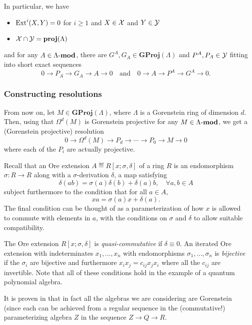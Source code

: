\documentclass[12pt]{article}
\begin{document}
In particular, we have
\begin{itemize}
    \item $\operatorname{Ext}^i(X,Y)=0$ for $i\ge 1$ and $X\in\mathcal{X}$ and $Y\in\mathcal{Y}$
    \item $\mathcal{X}\cap\mathcal{Y}=\mathbf{proj}(\Lambda)$
\end{itemize}
and for any $A\in\Lambda\text{-}\mathbf{mod}$, there are $G^A,G_A\in\mathbf{GProj}(\Lambda)$ and $P^A,P_A\in\mathcal{Y}$
fitting into short exact sequences
\[0\to P_A\to G_A\to A\to 0\quad\text{and}\quad 0\to A\to P^A\to G^A\to 0.\]

\subsubsection{Constructing resolutions}\label{subsubsec:construction-of-res}
From now on, let $M\in\mathbf{GProj}(\Lambda)$, where $\Lambda$ is a Gorenstein ring of dimension $d$. Then, using that $\Omega^{d}(M)$ is Gorenstein projective for any $M\in\Lambda\text{-}\mathbf{mod}$, we get a (Gorenstein projective) resolution
\[0\to\Omega^d(M)\to P_d\to \cdots\to P_0\to M\to 0\]
where each of the $P_i$ are actually projective.

\begin{rmk}
    Recall that an Ore extension $A\eqdef R[x;\sigma,\delta]$ of a ring $R$ is an endomorphism $\sigma:R\to R$ along with a $\sigma$-derivation $\delta$, a map satisfying
    \[\delta(ab)=\sigma(a)\delta(b)+\delta(a)b,\quad\forall a,b\in A\]
    subject furthermore to the condition that for all $a\in A$,
    \[xa=\sigma(a)x+\delta(a).\]
    The final condition can be thought of as a parameterization of how $x$ is allowed to commute with elements in $a$, with the conditions on $\sigma$ and $\delta$ to allow suitable compatibility.
    
    The Ore extension $R[x;\sigma,\delta]$ is \emph{quasi-commutative} if $\delta\equiv 0.$ An iterated Ore extension with indeterminates $x_1,\dots,x_n$ with endomorphisms $\sigma_1,\dots,\sigma_n$ is \emph{bijective} if the $\sigma_i$ are bijective and furthermore $x_ix_j=c_{ij}x_jx_i$ where all the $c_{ij}$ are invertible. Note that all of these conditions hold in the example of a quantum polynomial algebra.
\end{rmk}

\begin{rmk}
    It is proven in \cite[lem. 4.5]{negron-pevtsovaII} that in fact all the algebras we are considering are Gorenstein (since each can be achieved from a regular sequence in the (commutative!) parameterizing algebra $Z$ in the sequence $Z\to Q\to R$.
\end{rmk}
\end{document}
